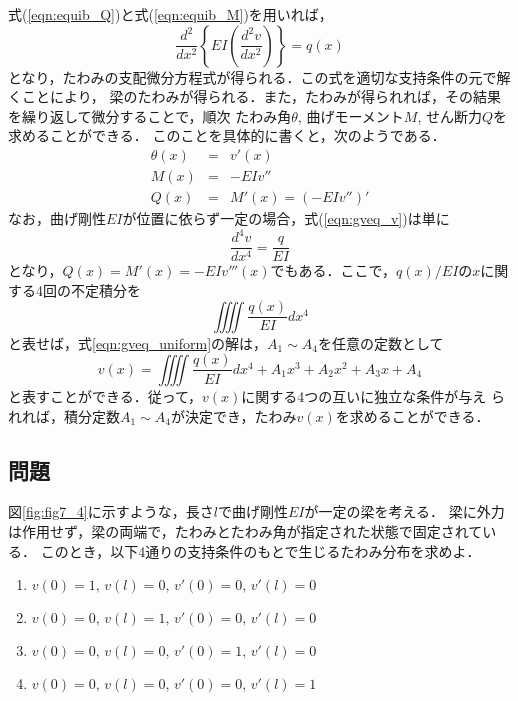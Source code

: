 \documentclass[10pt,a4j]{jarticle}
\begin{document}
式(\ref{eqn:equib_Q})と式(\ref{eqn:equib_M})を用いれば，
\begin{equation}
	\frac{d^2}{dx^2}\left\{ EI \left(\frac{d^2v}{dx^2}\right)\right\}=q(x)
	\label{eqn:gveq_v}
\end{equation}
となり，たわみの支配微分方程式が得られる．この式を適切な支持条件の元で解くことにより，
梁のたわみが得られる．また，たわみが得られれば，その結果を繰り返して微分することで，順次
たわみ角$\theta$, 曲げモーメント$M$, せん断力$Q$を求めることができる．
このことを具体的に書くと，次のようである．
\begin{eqnarray}
	\theta(x) &=& v'(x) \\
	M(x) &=& -EIv '' \\
	Q(x) &=& M'(x) = \left(-EIv''\right)' 
\end{eqnarray}
なお，曲げ剛性$EI$が位置に依らず一定の場合，式(\ref{eqn:gveq_v})は単に
\begin{equation}
	\frac{d^4v}{dx^4}=\frac{q}{EI}
	\label{eqn:gveq_uniform}
\end{equation}
となり，$Q(x)=M'(x)=-EIv'''(x)$でもある．ここで，$q(x)/EI$の$x$に関する4回の不定積分を
\[
	\iiiint \frac{q(x)}{EI}dx^4
\]
と表せば，式\ref{eqn:gveq_uniform}の解は，$A_1\sim A_4$を任意の定数として
\begin{equation}
	v(x)= 
	\iiiint \frac{q(x)}{EI}dx^4
	+A_1 x^3 +A_2x^2 + A_3x + A_4
	\label{eqn:vx_gsol}
\end{equation}
と表すことができる．従って，$v(x)$に関する4つの互いに独立な条件が与え
られれば，積分定数$A_1\sim A_4$が決定でき，たわみ$v(x)$を求めることができる．
\subsection{問題}\label{prb}
図\ref{fig:fig7_4}に示すような，長さ$l$で曲げ剛性$EI$が一定の梁を考える．
梁に外力は作用せず，梁の両端で，たわみとたわみ角が指定された状態で固定されている．
このとき，以下4通りの支持条件のもとで生じるたわみ分布を求めよ．
\begin{enumerate}
\item
$v(0)=1,\, v(l)=0,\, v'(0)=0,\, v'(l)=0$
\item
$v(0)=0,\, v(l)=1,\, v'(0)=0,\, v'(l)=0$
\item
$v(0)=0,\, v(l)=0,\, v'(0)=1,\, v'(l)=0$
\item
$v(0)=0,\, v(l)=0,\, v'(0)=0,\, v'(l)=1$
\end{enumerate}
\end{document}

